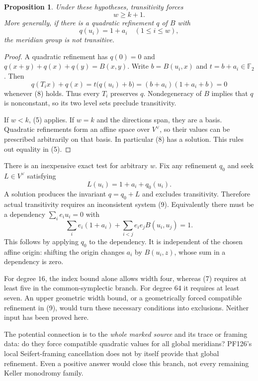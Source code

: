 \documentclass[11pt]{article}
\newtheorem{proposition}{Proposition}
\newcommand{\F}{\mathbb F}
\begin{document}
\begin{proposition}
Under these hypotheses, transitivity forces
\[
                         w\ge k+1.                            \tag{7}
\]
More generally, if there is a quadratic refinement $q$ of $B$ with
\[
                         q(u_i)=1+a_i\quad(1\le i\le w),        \tag{8}
\]
the meridian group is not transitive.
\end{proposition}
\begin{proof}
A quadratic refinement has $q(0)=0$ and
$q(x+y)+q(x)+q(y)=B(x,y)$. Write $b=B(u_i,x)$ and
$t=b+a_i\in\F_2$. Then
\[
 q(T_i x)+q(x)
   =t\bigl(q(u_i)+b\bigr)
   =(b+a_i)(1+a_i+b)=0
\]
whenever (8) holds. Thus every $T_i$ preserves $q$. Nondegeneracy of $B$
implies that $q$ is nonconstant, so its two level sets preclude transitivity.

If $w<k$, (5) applies. If $w=k$ and the directions span, they are a basis.
Quadratic refinements form an affine space over $V^\vee$, so their values
can be prescribed arbitrarily on that basis. In particular (8) has a
solution. This rules out equality in (5).
\end{proof}

There is an inexpensive exact test for arbitrary $w$. Fix any refinement
$q_0$ and seek $L\in V^\vee$ satisfying
\[
           L(u_i)=1+a_i+q_0(u_i).                              \tag{9}
\]
A solution produces the invariant $q=q_0+L$ and excludes transitivity.
Therefore actual transitivity requires an inconsistent system (9).
Equivalently there must be a dependency $\sum_i e_i u_i=0$ with
\[
 \sum_i e_i(1+a_i)+
 \sum_{i<j}e_i e_j B(u_i,u_j)=1.                               \tag{10}
\]
This follows by applying $q_0$ to the dependency. It is independent of the
chosen affine origin: shifting the origin changes $a_i$ by $B(u_i,z)$,
whose sum in a dependency is zero.

For degree $16$, the index bound alone allows width four, whereas (7)
requires at least five in the common-symplectic branch. For degree $64$
it requires at least seven. An upper geometric width bound, or a
geometrically forced compatible refinement in (9), would turn these
necessary conditions into exclusions. Neither input has been proved here.

The potential connection is to the \emph{whole marked source} and its
trace or framing data: do they force compatible quadratic values for all
global meridians? PF126's local Seifert-framing cancellation does not by
itself provide that global refinement. Even a positive answer would close
this branch, not every remaining Keller monodromy family.
\end{document}
